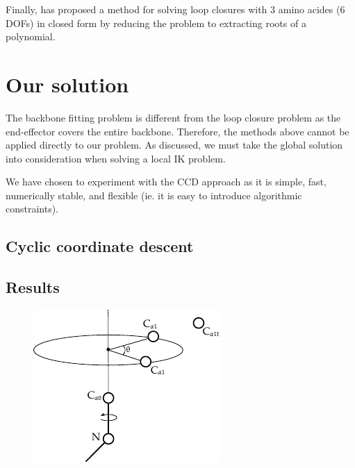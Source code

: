 Finally, \cite{wedemeyer1999exact} has proposed a method for solving loop closures with 3 amino acides (6 DOFs) in closed form by reducing the problem to extracting roots of a polynomial.


\section{Our solution}
The backbone fitting problem is different from the loop closure problem as the end-effector covers the entire backbone.
Therefore, the methods above cannot be applied directly to our problem.
As discussed, we must take the global solution into consideration when solving a local IK problem.

We have chosen to experiment with the CCD approach as it is simple, fast, numerically stable, and flexible (ie. it is easy to introduce algorithmic constraints).

\subsection{Cyclic coordinate descent}


\subsection{Results}




\begin{figure}
  \centering
	\includegraphics[width=0.75\columnwidth]{figures/ccd_angles}
	\label{fig:ccd_angles}
  \caption{}
\end{figure}

